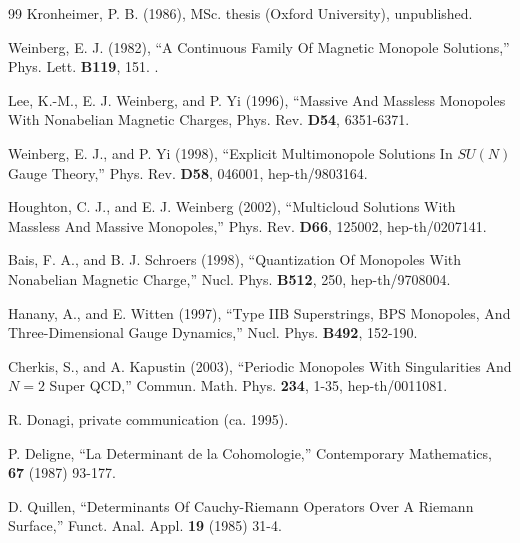 \begin{thebibliography}{99}
Kronheimer, P. B. (1986), MSc. thesis
 (Oxford University), unpublished.

Weinberg, E. J. (1982), ``A Continuous Family Of
Magnetic Monopole Solutions,'' Phys. Lett. {\bf B119}, 151.  .

Lee, K.-M., E. J. Weinberg, and P. Yi (1996), ``Massive And
Massless Monopoles With Nonabelian Magnetic Charges, Phys. Rev.
{\bf D54}, 6351-6371.

Weinberg, E. J., and P. Yi (1998), ``Explicit
Multimonopole Solutions In $SU(N)$ Gauge
Theory,'' Phys. Rev. {\bf D58}, 046001, hep-th/9803164.

Houghton, C. J., and E. J. Weinberg (2002), ``Multicloud
Solutions With Massless And Massive Monopoles,'' Phys. Rev. {\bf
D66}, 125002, hep-th/0207141.

Bais, F. A., and B. J. Schroers (1998), ``Quantization Of
Monopoles With Nonabelian Magnetic Charge,'' Nucl. Phys. {\bf
B512}, 250, hep-th/9708004.

Hanany, A., and E. Witten (1997), ``Type IIB
Superstrings, BPS Monopoles, And Three-Dimensional Gauge
Dynamics,'' Nucl. Phys. {\bf B492}, 152-190.

Cherkis, S., and A. Kapustin (2003), ``Periodic Monopoles With
Singularities And $N=2$ Super QCD,'' Commun. Math. Phys. {\bf 234}, 1-35, hep-th/0011081.

 R. Donagi, private communication (ca. 1995).

P. Deligne, ``La Determinant de la Cohomologie,'' Contemporary Mathematics,  {\bf 67} (1987) 93-177.

D. Quillen, ``Determinants Of Cauchy-Riemann Operators Over A Riemann Surface,''  
Funct. Anal. Appl. {\bf 19} (1985) 31-4.

\end{thebibliography}
